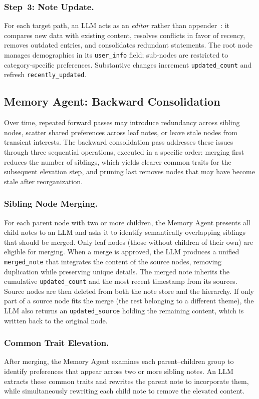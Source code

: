 \documentclass[sigconf,review,anonymous]{acmart}
\begin{document}
\subsubsection{Step~3: Note Update.}
For each target path, an LLM acts as an \textit{editor} rather than appender~\cite{mem0}: it compares new data with existing content, resolves conflicts in favor of recency, removes outdated entries, and consolidates redundant statements. The root node manages demographics in its \texttt{user\_info} field; sub-nodes are restricted to category-specific preferences. Substantive changes increment \texttt{updated\_count} and refresh \texttt{recently\_updated}.


\subsection{Memory Agent: Backward Consolidation}

Over time, repeated forward passes may introduce redundancy across sibling nodes, scatter shared preferences across leaf notes, or leave stale nodes from transient interests. The backward consolidation pass addresses these issues through three sequential operations, executed in a specific order: merging first reduces the number of siblings, which yields clearer common traits for the subsequent elevation step, and pruning last removes nodes that may have become stale after reorganization.

\subsubsection{Sibling Node Merging.}
For each parent node with two or more children, the Memory Agent presents all child notes to an LLM and asks it to identify semantically overlapping siblings that should be merged. Only leaf nodes (those without children of their own) are eligible for merging. When a merge is approved, the LLM produces a unified \texttt{merged\_note} that integrates the content of the source nodes, removing duplication while preserving unique details. The merged note inherits the cumulative \texttt{updated\_count} and the most recent timestamp from its sources. Source nodes are then deleted from both the note store and the hierarchy. If only part of a source node fits the merge (the rest belonging to a different theme), the LLM also returns an \texttt{updated\_source} holding the remaining content, which is written back to the original node.

\subsubsection{Common Trait Elevation.}
\label{sec:elevation}
After merging, the Memory Agent examines each parent--children group to identify preferences that appear across two or more sibling notes. An LLM extracts these common traits and rewrites the parent note to incorporate them, while simultaneously rewriting each child note to remove the elevated content.
\end{document}
